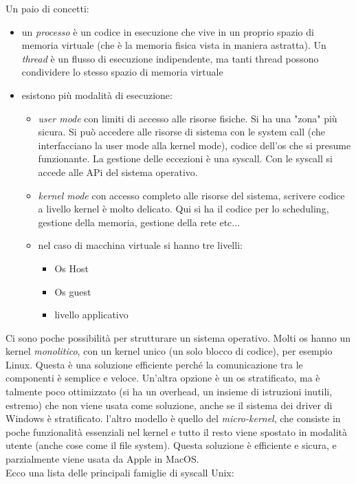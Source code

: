 \documentclass[a4paper,12pt, oneside]{book}
\begin{document}
Un paio di concetti:
\begin{itemize}
\item un \textit{processo} è un codice in esecuzione che vive in un proprio spazio di memoria virtuale (che è la memoria fisica vista in maniera astratta). Un \textit{thread} è un flusso di esecuzione indipendente, ma tanti thread possono condividere lo stesso spazio di memoria virtuale
\item esistono più modalità di esecuzione:
\begin{itemize}
\item \textit{user mode} con limiti di accesso alle risorse fisiche. Si ha una "zona" più sicura. Si può accedere alle risorse di sistema con le system call (che interfacciano la user mode alla kernel mode), codice dell'os che si presume funzionante. La gestione delle eccezioni è una syscall. Con le syscall si accede alle APi del sistema operativo.  
\item \textit{kernel mode} con accesso completo alle risorse del sistema, scrivere codice a livello kernel è molto delicato. Qui si ha il codice per lo scheduling, gestione della memoria, gestione della rete etc...
\item nel caso di macchina virtuale si hanno tre livelli:
\begin{itemize}
\item Os Host
\item Os guest
\item livello applicativo
\end{itemize}
\end{itemize}
\end{itemize}
Ci sono poche possibilità per strutturare un sistema operativo. Molti os hanno un kernel \textit{monolitico}, con un kernel unico (un solo blocco di codice), per esempio Linux. Questa è una soluzione efficiente perché la comunicazione tra le componenti è semplice e veloce. Un'altra opzione è un os stratificato, ma è talmente poco ottimizzato (si ha un overhead, un insieme di istruzioni inutili, estremo) che non viene usata come soluzione, anche se il sistema dei driver di Windows è stratificato. l'altro modello è quello del \textit{micro-kernel}, che consiste in poche funzionalità essenziali nel kernel e tutto il resto viene spostato in modalità utente (anche cose come il file system). Questa soluzione è efficiente e sicura, e parzialmente viene usata da Apple in MacOS. \\
Ecco una lista delle principali famiglie di syscall Unix:
\end{document}
